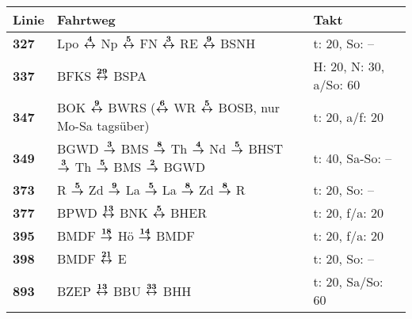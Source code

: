 \begin{minipage}[t]{0.45\textwidth}
\begin{tabular}{>{\bfseries}L{1.2cm}L{9.0cm}L{3.0cm}}
{\bfseries Linie} & {\bfseries Fahrtweg} & {\bfseries Takt} \\
\hline
\bus{} 327    & Lpo $\boldsymbol{\overset{4}{\leftrightarrow}}$ Np $\boldsymbol{\overset{5}{\leftrightarrow}}$ FN $\boldsymbol{\overset{3}{\leftrightarrow}}$ RE $\boldsymbol{\overset{9}{\leftrightarrow}}$ BSNH                                                                                                   & t: 20, So: --              \\
\bus{} 337    & BFKS $\boldsymbol{\overset{29}{\leftrightarrow}}$ BSPA                                                                                                                                              & H: 20, N: 30, a/So: 60     \\
\bus{} 347    & BOK $\boldsymbol{\overset{9}{\leftrightarrow}}$ BWRS ($\boldsymbol{\overset{6}{\leftrightarrow}}$ WR $\boldsymbol{\overset{5}{\leftrightarrow}}$ BOSB, nur Mo-Sa tagsüber)                                                                                          & t: 20, a/f: 20             \\
\bus{} 349    & BGWD $\boldsymbol{\overset{3}{\rightarrow}}$ BMS $\boldsymbol{\overset{8}{\rightarrow}}$ Th $\boldsymbol{\overset{4}{\rightarrow}}$ Nd $\boldsymbol{\overset{5}{\rightarrow}}$ BHST $\boldsymbol{\overset{3}{\rightarrow}}$ Th $\boldsymbol{\overset{5}{\rightarrow}}$ BMS $\boldsymbol{\overset{2}{\rightarrow}}$ BGWD                                                 & t: 40, Sa-So: --           \\
\bus{} 373    & R $\boldsymbol{\overset{5}{\rightarrow}}$ Zd $\boldsymbol{\overset{9}{\rightarrow}}$ La $\boldsymbol{\overset{5}{\rightarrow}}$ La $\boldsymbol{\overset{8}{\rightarrow}}$ Zd $\boldsymbol{\overset{8}{\rightarrow}}$ R                                                                                         & t: 20, So: --              \\
\bus{} 377    & BPWD $\boldsymbol{\overset{13}{\leftrightarrow}}$ BNK $\boldsymbol{\overset{5}{\leftrightarrow}}$ BHER                                                                                                                              & t: 20, f/a: 20             \\
\bus{} 395    & BMDF $\boldsymbol{\overset{18}{\rightarrow}}$ Hö $\boldsymbol{\overset{14}{\rightarrow}}$ BMDF                                                                                                                              & t: 20, f/a: 20             \\
\bus{} 398    & BMDF $\boldsymbol{\overset{21}{\leftrightarrow}}$ E                                                                                                                                                 & t: 20, So: --              \\
\bus{} 893    & BZEP $\boldsymbol{\overset{13}{\leftrightarrow}}$ BBU $\boldsymbol{\overset{33}{\leftrightarrow}}$ BHH                                                                                                                              & t: 20, Sa/So: 60           \\
\hline
\end{tabular}
\end{minipage}
\begin{minipage}[t]{0.05\textwidth}
\phantom{Tor}
\end{minipage}
\fi
